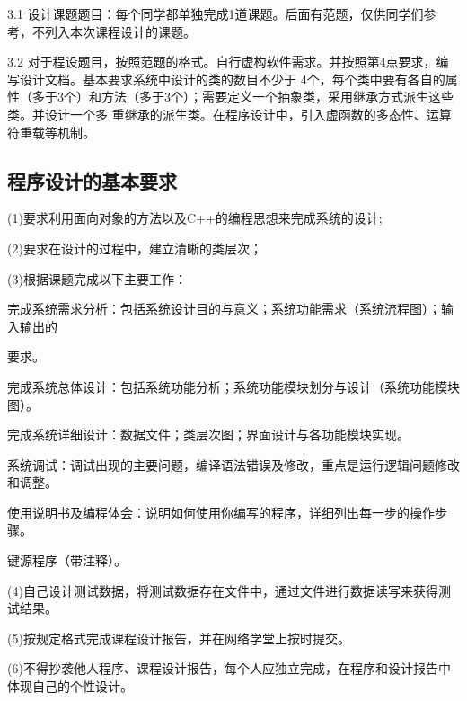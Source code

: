 \documentclass[fontset=windows]{article}
\begin{document}
3.1 设计课题题目：每个同学都单独完成1道课题。后面有范题，仅供同学们参考，不列入本次课程设计的课题。

3.2 对于程设题目，按照范题的格式。自行虚构软件需求。并按照第4点要求，编写设计文档。基本要求系统中设计的类的数目不少于
4个，每个类中要有各自的属性（多于3个）和方法（多于3个）；需要定义一个抽象类，采用继承方式派生这些类。并设计一个多
重继承的派生类。在程序设计中，引入虚函数的多态性、运算符重载等机制。

\subsection{程序设计的基本要求}
(1)要求利用面向对象的方法以及C++的编程思想来完成系统的设计;

(2)要求在设计的过程中，建立清晰的类层次；

(3)根据课题完成以下主要工作：

\hspace{1cm}完成系统需求分析：包括系统设计目的与意义；系统功能需求（系统流程图）；输入输出的

\hspace{1cm}要求。

\hspace{1cm}完成系统总体设计：包括系统功能分析；系统功能模块划分与设计（系统功能模块图）。

\hspace{1cm}完成系统详细设计：数据文件；类层次图；界面设计与各功能模块实现。

\hspace{1cm}系统调试：调试出现的主要问题，编译语法错误及修改，重点是运行逻辑问题修改和调整。

\hspace{1cm}使用说明书及编程体会：说明如何使用你编写的程序，详细列出每一步的操作步骤。

\hspace{1cm}键源程序（带注释）。

(4)自己设计测试数据，将测试数据存在文件中，通过文件进行数据读写来获得测试结果。

(5)按规定格式完成课程设计报告，并在网络学堂上按时提交。

(6)不得抄袭他人程序、课程设计报告，每个人应独立完成，在程序和设计报告中体现自己的个性设计。

\end{document}
